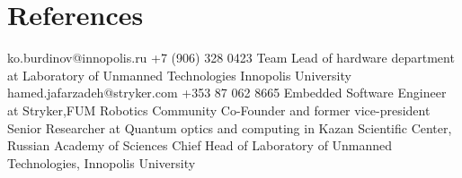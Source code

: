 \newpage
\section{References}
    \vspace{3mm}
    {ko.burdinov@innopolis.ru
    \hspace{7mm} +7 (906) 328 0423 }
    {Team Lead of hardware department at Laboratory of Unmanned Technologies
    Innopolis University
    }
    \vspace{3mm}
    {hamed.jafarzadeh@stryker.com 
    \hspace{7mm} +353 87 062 8665}
    {Embedded Software Engineer at Stryker,FUM Robotics Community Co-Founder and former vice-president }
    \vspace{3mm}
    {
     Senior Researcher at Quantum optics and computing  in  Kazan Scientific Center, Russian Academy of Sciences
    }
    \vspace{3mm}
    {Chief Head of Laboratory of Unmanned Technologies,
    Innopolis University
    }